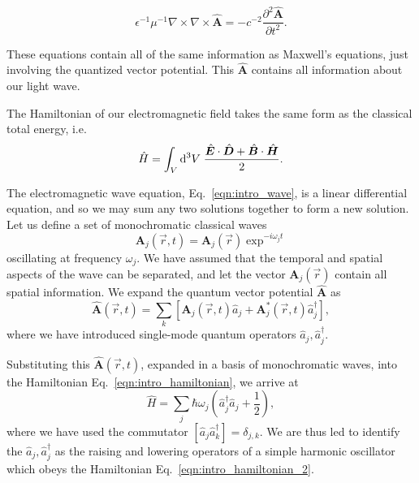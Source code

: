 \begin{equation}\label{eqn:intro_wave}
\epsilon^{-1} \mu^{-1} \nabla \times \nabla \times \hat{\bm{A}} = - c^{-2} \frac{\partial^2 \hat{\bm{A}}}{\partial t^2}.
\end{equation}

\noindent These equations contain all of the same information as Maxwell's equations, just involving the quantized vector potential. This $\hat{\bm{A}}$ contains all information about our light wave. 

The Hamiltonian of our electromagnetic field takes the same form as the classical total energy, i.e.
\begin{equation}\label{eqn:intro_hamiltonian}
\hat{H} = \int_V \mathop{}\!\mathrm{d^3} V \; \frac{\hat{\bm{E}} \cdot \hat{\bm{D}} + \hat{\bm{B}} \cdot \hat{\bm{H}}}{2}.
\end{equation}


\noindent The electromagnetic wave equation, Eq.~\ref{eqn:intro_wave}, is a linear differential equation, and so we may sum any two solutions together to form a new solution. Let us define a set of monochromatic classical waves
\begin{equation}
\bm{A}_j\left(\overrightarrow{r}, t\right) = \bm{A}_j\left(\overrightarrow{r}\right) \exp^{-i \omega_j t}
\end{equation}
oscillating at frequency $\omega_j$. We have assumed that the temporal and spatial aspects of the wave can be separated, and let the vector $\bm{A}_j\left(\overrightarrow{r}\right)$ contain all spatial information. %
We expand the quantum vector potential $\hat{\bm{A}}$ as
\begin{equation}
\hat{\bm{A}}\left(\overrightarrow{r}, t\right) = \sum_k \left[ \bm{A}_j\left(\overrightarrow{r}, t\right) \hat{a}_j + \bm{A}_j^* \left(\overrightarrow{r}, t\right) \hat{a}_j^\dagger\right],
\end{equation}
where we have introduced single-mode quantum operators $\hat{a}_j, \hat{a}_j^\dagger$.

Substituting this $\hat{\bm{A}}\left(\overrightarrow{r}, t\right)$, expanded in a basis of monochromatic waves, into the Hamiltonian Eq.~\ref{eqn:intro_hamiltonian}, we arrive at
\begin{equation}\label{eqn:intro_hamiltonian_2}
\hat{H} = \sum_j \hbar \omega_j \left( \hat{a}_j^\dagger \hat{a}_j + \frac{1}{2}\right),
\end{equation}
where we have used the commutator $\left[ \hat{a}_j \hat{a}_k^\dagger \right] = \delta_{j, k}$. We are thus led to identify the $\hat{a}_j, \hat{a}_j^\dagger$ as the raising and lowering operators of a simple harmonic oscillator which obeys the Hamiltonian Eq.~\ref{eqn:intro_hamiltonian_2}. 

